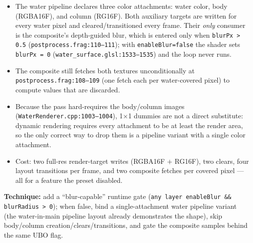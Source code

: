 \documentclass[11pt,a4paper]{article}
\begin{document}
\begin{itemize}
    \item The water pipeline declares three color attachments: water color, body (RGBA16F), and column (RG16F). Both auxiliary targets are written for every water pixel and
    cleared/transitioned every frame. Their \emph{only} consumer is the composite's depth-guided blur, which is entered only when \texttt{blurPx > 0.5}
    (\texttt{postprocess.frag:110--111}); with \texttt{enableBlur=false} the shader sets \texttt{blurPx = 0} (\texttt{water\_surface.glsl:1533--1535}) and the loop never runs.
    \item The composite still fetches both textures unconditionally at \texttt{postprocess.frag:108--109} (one fetch each per water-covered pixel) to compute values that are
    discarded.
    \item Because the pass hard-requires the body/column images (\texttt{WaterRenderer.cpp:1003--1004}), 1$\times$1 dummies are not a direct substitute: dynamic rendering
    requires every attachment to be at least the render area, so the only correct way to drop them is a pipeline variant with a single color attachment.
    \item Cost: two full-res render-target writes (RGBA16F $+$ RG16F), two clears, four layout transitions per frame, and two composite fetches per covered pixel --- all for a
    feature the preset disabled.
\end{itemize}

\textbf{Technique:} add a ``blur-capable'' runtime gate (\texttt{any layer enableBlur \&\& blurRadius > 0}); when false, bind a single-attachment water pipeline variant (the
water-in-main pipeline layout already demonstrates the shape), skip body/column creation/clears/transitions, and gate the composite samples behind the same UBO flag.
\end{document}
